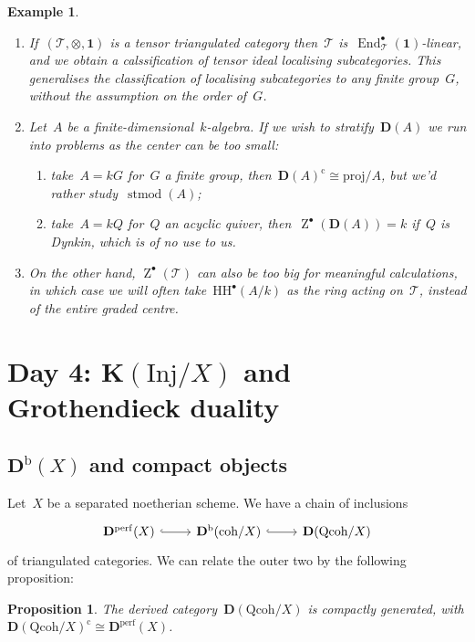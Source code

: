 \documentclass[10pt,a4paper]{article}
\theoremstyle{lecture}
\newtheorem{example}[theorem]{Example}
\newtheorem{proposition}[theorem]{Proposition}
\newcommand\dash{\nobreakdash-\hspace{0pt}}
\newcommand\bounded{\ensuremath{\mathrm{b}}}
\newcommand\cc{\ensuremath{\mathrm{c}}}
\newcommand\coh{\ensuremath{\mathrm{coh}}}
\newcommand\derived{\ensuremath{\mathbf{D}}}
\newcommand\Inj{\ensuremath{\mathrm{Inj}}}
\newcommand\perf{\ensuremath{\mathrm{perf}}}
\newcommand\proj{\ensuremath{\mathrm{proj}}}
\newcommand\Qcoh{\ensuremath{\mathrm{Qcoh}}}
\DeclareMathOperator\centre{Z}
\DeclareMathOperator\End{End}
\DeclareMathOperator\stmod{stmod}
\begin{document}
\begin{example}
  \begin{enumerate}
    \item If~$(\mathcal{T},\otimes,\mathbf{1})$ is a tensor triangulated category then~$\mathcal{T}$ is~$\End_{\mathcal{T}}^\bullet(\mathbf{1})$-linear, and we obtain a calssification of tensor ideal localising subcategories. This generalises the classification of localising subcategories to any finite group~$G$, without the assumption on the order of~$G$.
    \item Let~$A$ be a finite-dimensional~$k$\dash algebra. If we wish to stratify~$\derived(A)$ we run into problems as the center can be \emph{too small}:
      \begin{enumerate}
        \item take~$A=kG$ for~$G$ a finite group, then~$\derived(A)^\cc\cong\proj/A$, but we'd rather study~$\stmod(A)$;
        \item take~$A=kQ$ for~$Q$ an acyclic quiver, then~$\centre^\bullet(\derived(A))=k$ if~$Q$ is Dynkin, which is of no use to us.
      \end{enumerate}
    \item On the other hand, $\centre^\bullet(\mathcal{T})$ can also be \emph{too big} for meaningful calculations, in which case we will often take~$\mathrm{HH}^\bullet(A/k)$ as the ring acting on~$\mathcal{T}$, instead of the entire graded centre.
  \end{enumerate}
\end{example}


\section{Day 4: \texorpdfstring{$\mathbf{K}(\Inj/X)$}{K(Inj/X)} and Grothendieck duality}
\subsection{\texorpdfstring{$\derived^\bounded(X)$}{Db(X)} and compact objects}
Let~$X$ be a separated noetherian scheme. We have a chain of inclusions
\begin{equation}
  \begin{tikzcd}
    \derived^\perf(X) \arrow[hook]{r} & \derived^\bounded(\coh/X) \arrow[hook]{r} & \derived(\Qcoh/X)
  \end{tikzcd}
\end{equation}
of triangulated categories. We can relate the outer two by the following proposition:
\begin{proposition}
  The derived category~$\derived(\Qcoh/X)$ is compactly generated, with $\derived(\Qcoh/X)^\cc\cong\derived^\perf(X)$.
\end{proposition}
\end{document}
